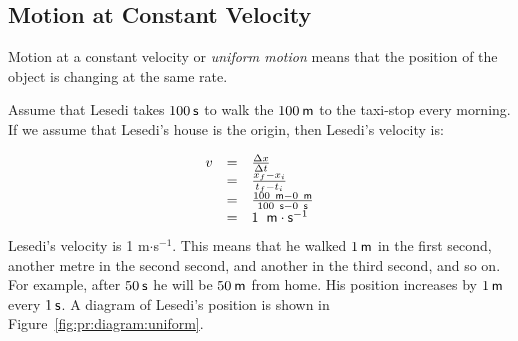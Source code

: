             \subsection*{Motion at Constant Velocity}
            \nopagebreak
        \label{m38795*id69835}Motion at a constant velocity or \textsl{uniform motion} means that the position of the object is changing at the same rate.\par 
        \label{m38795*id69845}Assume that Lesedi takes $100\phantom{\rule{2pt}{0ex}}\mathsf{s}$ to walk the $100\phantom{\rule{2pt}{0ex}}\mathsf{m}$ to the taxi-stop every morning. If we assume that Lesedi's house is the origin, then Lesedi's velocity is:\par 
        \label{m38795*id69850}\nopagebreak\noindent{}
          
    \begin{equation}
    \begin{array}{ccc}\hfill v& =& \frac{\Delta x}{\Delta t}\hfill \\ & =& \frac{{x}_{f}-{x}_{i}}{{t}_{f}-{t}_{i}}\hfill \\ & =& \frac{100\phantom{\rule{4pt}{0ex}}\mathsf{m}-0\phantom{\rule{4pt}{0ex}}\mathsf{m}}{100\phantom{\rule{4pt}{0ex}}\mathsf{s}-0\phantom{\rule{4pt}{0ex}}\mathsf{s}}\hfill \\ & =& 1\phantom{\rule{4pt}{0ex}}\phantom{\rule{0.166667em}{0ex}}\mathsf{m}\ensuremath{\cdot}{\mathsf{s}}^{-1}\hfill \end{array}
      \end{equation}
        \label{m38795*id70029}Lesedi's velocity is 1 m$\ensuremath{\cdot}$s${}^{-1}$. This means that he walked $1\phantom{\rule{2pt}{0ex}}\mathsf{m}$ in the first second, another metre in the second second, and another in the third second, and so on. For example, after $50\phantom{\rule{2pt}{0ex}}\mathsf{s}$ he will be $50\phantom{\rule{2pt}{0ex}}\mathsf{m}$ from home. His position increases by $1\phantom{\rule{2pt}{0ex}}\mathsf{m}$ every $1\phantom{\rule{2pt}{0ex}}\mathsf{s}$. A diagram of Lesedi's position is shown in Figure~\ref{fig:pr:diagram:uniform}.\par 
    \setcounter{subfigure}{0}
